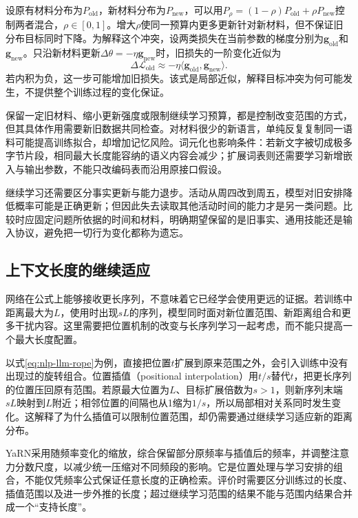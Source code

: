 设原有材料分布为$P_{\mathrm{old}}$，新材料分布为$P_{\mathrm{new}}$，可以用$P_\rho=(1-\rho)P_{\mathrm{old}}+\rho P_{\mathrm{new}}$控制两者混合，$\rho\in[0,1]$。增大$\rho$使同一预算内更多更新针对新材料，但不保证旧分布目标同时下降。为解释这个冲突，设两类损失在当前参数的梯度分别为$\bm g_{\mathrm{old}}$和$\bm g_{\mathrm{new}}$。只沿新材料更新$\Delta\theta=-\eta\bm g_{\mathrm{new}}$时，旧损失的一阶变化近似为
\begin{equation}
 \Delta\mathcal L_{\mathrm{old}}
 \approx-\eta\langle\bm g_{\mathrm{old}},\bm g_{\mathrm{new}}\rangle.
 \label{eq:nlp-llm-continuation-conflict}
\end{equation}
若内积为负，这一步可能增加旧损失。该式是局部近似，解释目标冲突为何可能发生，不提供整个训练过程的变化保证。

保留一定旧材料、缩小更新强度或限制继续学习预算，都是控制改变范围的方式，但其具体作用需要新旧数据共同检查。对材料很少的新语言，单纯反复复制同一语料可能提高训练拟合，却增加记忆风险。词元化也影响条件：若新文字被切成极多字节片段，相同最大长度能容纳的语义内容会减少；扩展词表则还需要学习新增嵌入与输出参数，不能只改编码表而沿用原接口假设。

继续学习还需要区分事实更新与能力退步。活动从周四改到周五，模型对旧安排降低概率可能是正确更新；但因此失去读取其他活动时间的能力才是另一类问题。比较时应固定问题所依据的时间和材料，明确期望保留的是旧事实、通用技能还是输入协议，避免把一切行为变化都称为遗忘。

\subsection{上下文长度的继续适应}
\label{sec:nlp-llm-context-extension}

网络在公式上能够接收更长序列，不意味着它已经学会使用更远的证据。若训练中距离最大为$L$，使用时出现$sL$的序列，模型同时面对新位置范围、新距离组合和更多干扰内容。这里需要把位置机制的改变与长序列学习一起考虑，而不能只提高一个最大长度配置。

以式\eqref{eq:nlp-llm-rope}为例，直接把位置$t$扩展到原来范围之外，会引入训练中没有出现过的旋转组合。位置插值（positional interpolation）用$t/s$替代$t$，把更长序列的位置压回原有范围。若原最大位置为$L$、目标扩展倍数为$s>1$，则新序列末端$sL$映射到$L$附近；相邻位置的间隔也从1缩为$1/s$，所以局部相对关系同时发生变化。这解释了为什么插值可以限制位置范围，却仍需要通过继续学习适应新的距离分布。

YaRN采用随频率变化的缩放，综合保留部分原频率与插值后的频率，并调整注意力分数尺度，以减少统一压缩对不同频段的影响。它是位置处理与学习安排的组合，不能仅凭频率公式保证任意长度的正确检索。评价时需要区分训练过的长度、插值范围以及进一步外推的长度；超过继续学习范围的结果不能与范围内结果合并成一个“支持长度”。

